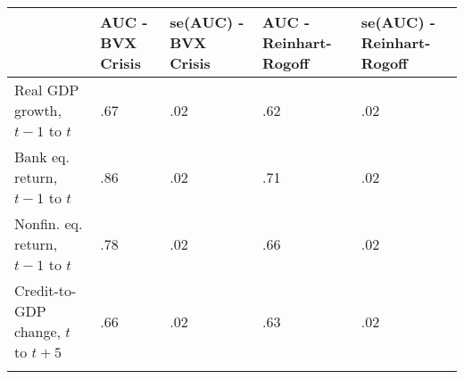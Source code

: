 \begin{table}[tbp] \centering
{}

{\small
\begin{tabularx}{6in}{l C C C C}

\toprule
{}&{AUC - BVX Crisis}&{se(AUC) - BVX Crisis}&{AUC - Reinhart-Rogoff}&{se(AUC) - Reinhart-Rogoff} \tabularnewline
\midrule\addlinespace[1.5ex]
Real GDP growth, \(t-1\) to \(t\)&.67&.02&.62&.02 \tabularnewline
Bank eq. return, \(t-1\) to \(t\)&.86&.02&.71&.02 \tabularnewline
Nonfin. eq. return, \(t-1\) to \(t\)&.78&.02&.66&.02 \tabularnewline
Credit-to-GDP change, \(t\) to \(t+5\)&.66&.02&.63&.02 \tabularnewline
\bottomrule \addlinespace[1.5ex]

\end{tabularx}
}
\end{table}
